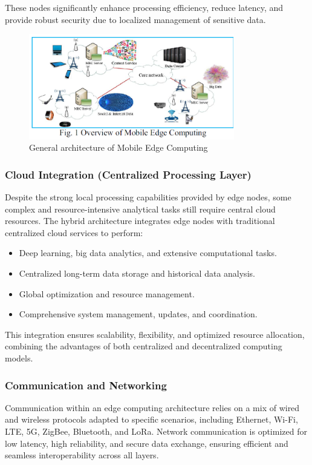 \documentclass[runningheads]{llncs}
\begin{document}
These nodes significantly enhance processing efficiency, reduce latency, and provide robust security due to localized management of sensitive data.

\begin{figure}[ht]
    \centering
    \includegraphics[width=0.8\textwidth]{IMG/4.png}
    \caption{General architecture of Mobile Edge Computing}
    \label{fig:mec_architecture}
    \end{figure}
\FloatBarrier

\subsubsection{Cloud Integration (Centralized Processing Layer)}
Despite the strong local processing capabilities provided by edge nodes, some complex and resource-intensive analytical tasks still require central cloud resources. The hybrid architecture integrates edge nodes with traditional centralized cloud services to perform:
\begin{itemize}
    \item Deep learning, big data analytics, and extensive computational tasks.
    \item Centralized long-term data storage and historical data analysis.
    \item Global optimization and resource management.
    \item Comprehensive system management, updates, and coordination.
\end{itemize}

This integration ensures scalability, flexibility, and optimized resource allocation, combining the advantages of both centralized and decentralized computing models.

\subsubsection{Communication and Networking}
Communication within an edge computing architecture relies on a mix of wired and wireless protocols adapted to specific scenarios, including Ethernet, Wi-Fi, LTE, 5G, ZigBee, Bluetooth, and LoRa. Network communication is optimized for low latency, high reliability, and secure data exchange, ensuring efficient and seamless interoperability across all layers.
\end{document}
